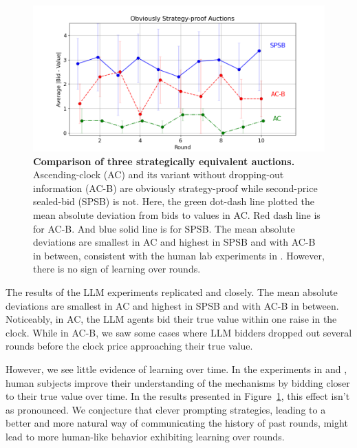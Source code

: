 \documentclass{article} %
\begin{document}
\begin{figure}[h]  
    \centering  
\includegraphics[width=\linewidth]{Figs/OSP.png}  
    \caption{\textbf{Comparison of three strategically equivalent auctions.} Ascending-clock (AC) and its variant without dropping-out information (AC-B) are obviously strategy-proof while second-price sealed-bid (SPSB) is not. Here, the green dot-dash line plotted the mean absolute deviation from bids to values in AC. Red dash line is for AC-B. And blue solid line is for SPSB. The mean absolute deviations are smallest in AC and highest in SPSB and with AC-B in between, consistent with the human lab experiments in \cite{breitmoser2022obviousness}. However, there is no sign of learning over rounds.}
    \label{fig:osp}
\end{figure}

The results of the LLM experiments replicated \cite{li2017obviously} and \citet{breitmoser2022obviousness} closely. The mean absolute deviations are smallest in AC and highest in SPSB and with AC-B in between.
Noticeably, in AC, the LLM agents bid their true value within one raise in the clock. While in AC-B, we saw some cases where LLM bidders dropped out several rounds before the clock price approaching their true value.

However, we see little evidence of learning over time. 
In the experiments in \citet{li2017obviously} and \citet{breitmoser2022obviousness}, human subjects improve their understanding of the mechanisms by bidding closer to their true value over time. 
In the results presented in Figure~\ref{fig:osp}, this effect isn't as pronounced. 
We conjecture that clever prompting strategies, leading to a better and more natural way of communicating the history of past rounds, might lead to more human-like behavior exhibiting learning over rounds.
\end{document}
